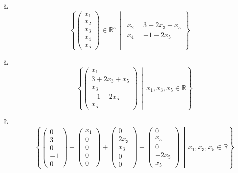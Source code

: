 \documentclass[english,hebrew]{article}
\begin{document}
\L{%
\[
\left\{ \begin{pmatrix}x_{1}\\
x_{2}\\
x_{3}\\
x_{4}\\
x_{5}
\end{pmatrix}\in\mathbb{R}^{5}\,\middle|\,\begin{array}{l}
x_{2}=3+2x_{3}+x_{5}\\
x_{4}=-1-2x_{5}
\end{array}\right\} 
\]
}%

\L{%
\[
=\left\{ \begin{pmatrix}x_{1}\\
3+2x_{3}+x_{5}\\
x_{3}\\
-1-2x_{5}\\
x_{5}
\end{pmatrix}\,\middle|\,x_{1},x_{3},x_{5}\in\mathbb{R}\right\} 
\]
}%

\L{%
\[
=\left\{ \begin{pmatrix}0\\
3\\
0\\
-1\\
0
\end{pmatrix}+\begin{pmatrix}x_{1}\\
0\\
0\\
0\\
0
\end{pmatrix}+\begin{pmatrix}0\\
2x_{3}\\
x_{3}\\
0\\
0
\end{pmatrix}+\begin{pmatrix}0\\
x_{5}\\
0\\
-2x_{5}\\
x_{5}
\end{pmatrix}\,\middle|\,x_{1},x_{3},x_{5}\in\mathbb{R}\right\} 
\]
}%
\end{document}

